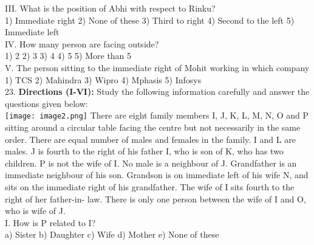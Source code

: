 \documentclass[
]{article}
\begin{document}
III. What is the position of Abhi with respect to Rinku?\\
1) Immediate right \hspace{2mm}2) None of these \hspace{2mm}3) Third to right
\hspace{2mm}4) Second to the left \hspace{2mm}5) Immediate left\\

IV. How many person are facing outside?\\
1) 2 \hspace{2mm}2) 3 \hspace{2mm}3) 4 \hspace{2mm}4) 5 \hspace{2mm}5) More than 5\\

V. The person sitting to the immediate right of Mohit working in which company\\
1) TCS \hspace{2mm}2) Mahindra \hspace{2mm}3) Wipro \hspace{2mm}4) Mphasis \hspace{2mm}5) Infosys\\

23. \textbf{Directions (I-VI):} Study the following information carefully and answer the questions given
below:\\
\texttt{[image: image2.png]}
There are eight family members I, J, K, L, M, N, O and P sitting around a circular table
facing the centre but not necessarily in the same order. There are equal number of males and
females in the family. I and L are males. J is fourth to the right of his father I, who is son of
K, who has two children. P is not the wife of I. No male is a neighbour of J. Grandfather is
an immediate neighbour of his son. Grandson is on immediate left of his wife N, and sits on
the immediate right of his grandfather. The wife of I sits fourth to the right of her father-in-
law. There is only one person between the wife of I and O, who is wife of J.\\

I. How is P related to I?\\
a) Sister \hspace{2mm}b) Daughter \hspace{2mm}c) Wife \hspace{2mm}d) Mother \hspace{2mm}e) None of these\\
\end{document}

